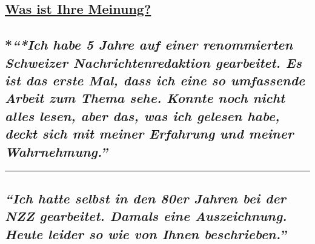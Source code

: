 \hypertarget{was-ist-ihre-meinung}{%
\subsection{\texorpdfstring{\href{https://swprs.org/kontakt/}{Was ist
Ihre Meinung?}}{Was ist Ihre Meinung?}}\label{was-ist-ihre-meinung}}

\hypertarget{ich-habe-5-jahre-auf-einer-renommierten-schweizer-nachrichtenredaktion-gearbeitet-es-ist-das-erste-mal-dass-ich-eine-so-umfassende-arbeit-zum-thema-sehe-konnte-noch-nicht-alles-lesen-aber-das-was-ich-gelesen-habe-deckt-sich-mit-meiner-erfahrung-und-meiner-wahrnehmung}{%
\subsection{\texorpdfstring{*\emph{``*Ich habe 5 Jahre auf einer
renom­mierten Schweizer Nach­rich­ten­­redaktion gearbeitet. \emph{Es
ist das erste Mal, dass ich eine so umfassende Arbeit zum Thema sehe.
Konnte noch nicht alles lesen, aber das, was ich gelesen habe, deckt
sich mit meiner Erfahrung und meiner
Wahrnehmung.''}}}{*``*Ich habe 5 Jahre auf einer renom­mierten Schweizer Nach­rich­ten­­redaktion gearbeitet. Es ist das erste Mal, dass ich eine so umfassende Arbeit zum Thema sehe. Konnte noch nicht alles lesen, aber das, was ich gelesen habe, deckt sich mit meiner Erfahrung und meiner Wahrnehmung.''}}\label{ich-habe-5-jahre-auf-einer-renommierten-schweizer-nachrichtenredaktion-gearbeitet-es-ist-das-erste-mal-dass-ich-eine-so-umfassende-arbeit-zum-thema-sehe-konnte-noch-nicht-alles-lesen-aber-das-was-ich-gelesen-habe-deckt-sich-mit-meiner-erfahrung-und-meiner-wahrnehmung}}

\begin{center}\rule{0.5\linewidth}{\linethickness}\end{center}

\hypertarget{ich-hatte-selbst-in-den-80er-jahren-bei-der-nzz-gearbeitet-damals-eine-auszeichnung-heute-leider-so-wie-von-ihnen-beschrieben}{%
\subsection{\texorpdfstring{\emph{``Ich hatte selbst in den 80er Jahren
bei der NZZ gearbeitet. Damals eine Auszeichnung. Heute leider so wie
von Ihnen
beschrieben.''}}{``Ich hatte selbst in den 80er Jahren bei der NZZ gearbeitet. Damals eine Auszeichnung. Heute leider so wie von Ihnen beschrieben.''}}\label{ich-hatte-selbst-in-den-80er-jahren-bei-der-nzz-gearbeitet-damals-eine-auszeichnung-heute-leider-so-wie-von-ihnen-beschrieben}}

